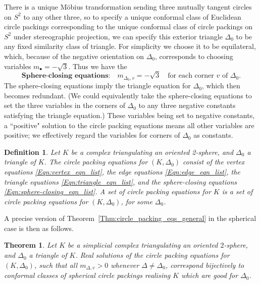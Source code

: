 \documentclass[12pt]{amsart}
\numberwithin{equation}{section}
\newtheorem{theorem}[equation]{Theorem}
\newtheorem{definition}[equation]{Definition}
\theoremstyle{named}
\newcommand{\refeqn}[1]{\eqref{Eqn:#1}}
\newcommand{\refthm}[1]{Theorem~\ref{Thm:#1}}
\begin{document}
There is a unique M\"{o}bius transformation sending three mutually tangent circles on $S^2$ to any other three, so to specify a unique conformal class of Euclidean circle packings corresponding to the unique conformal class of circle packings on $S^2$ under stereographic projection, we can specify this exterior triangle $\Delta_0$ to be any fixed similarity class of triangle. For simplicity we choose it to be equilateral, which, because of the negative orientation on $\Delta_0$, corresponds to choosing variables $m_\bullet = -\sqrt{3}$. Thus we have the
\begin{equation}
\label{Eqn:sphere-closing_eqn_list}
\textbf{Sphere-closing equations:} \quad
m_{\Delta_0,v} = - \sqrt{3}
\quad \text{for each corner $v$ of $\Delta_0$.}
\end{equation}
The sphere-closing equations imply the triangle equation for $\Delta_0$, which then becomes redundant. (We could equivalently take the sphere-closing equations to set the three variables in the corners of $\Delta_0$ to any three negative constants satisfying the triangle equation.) These variables being set to negative constants, a ``positive" solution to the circle packing equations means all other variables are positive; we effectively regard the variables for corners of $\Delta_0$ as constants. 

\begin{definition}
\label{Def:circle_packing_eqns_sphere}
Let $K$ be a complex triangulating an oriented 2-sphere, and $\Delta_0$ a triangle of $K$. The \emph{circle packing equations} for $(K, \Delta_0)$ consist of the vertex equations \refeqn{vertex_eqn_list}, the edge equations \refeqn{edge_eqn_list}, the triangle equations \refeqn{triangle_eqn_list}, and the sphere-closing equations \refeqn{sphere-closing_eqn_list}.
A set of circle packing equations for $K$ is a set of circle packing equations for $(K, \Delta_0)$, for some $\Delta_0$.
\end{definition}

A precise version of \refthm{circle_packing_eqs_general} in the spherical case is then as follows.
\begin{theorem}
\label{Thm:circle_packing_eqs_spherical}
Let $K$ be a simplicial complex triangulating an oriented $2$-sphere, and $\Delta_0$ a triangle of $K$. 
Real solutions of the circle packing equations for $(K, \Delta_0)$, such that all $m_{\Delta,v} > 0$ whenever $\Delta \neq \Delta_0$, correspond bijectively to conformal classes of spherical circle packings realising $K$ which are good for $\Delta_0$.
\end{theorem}
\end{document}
